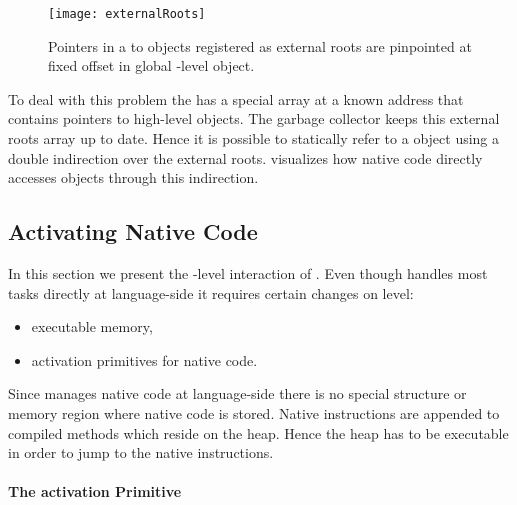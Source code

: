 \begin{figure}[h]
	\centering
	\texttt{[image: externalRoots]}
	\caption[\NBFFI External Roots]{Pointers in a  to objects registered as external roots are pinpointed at fixed offset in global \VM-level object.}
\end{figure}

To deal with this problem the \VM has a special array at a known address that contains pointers to high-level objects.
The garbage collector keeps this external roots array up to date.
Hence it is possible to statically refer to a \PH object using a double indirection over the external roots.
 visualizes how native code directly accesses \PH objects through this indirection.


\subsection{Activating Native Code}

In this section we present the \VM-level interaction of \NB.
Even though \NB handles most tasks directly at language-side it requires certain changes on \VM level:
\begin{itemize}
	\item executable memory,
	\item activation primitives for native code.
\end{itemize}
%
Since \NB manages native code at language-side there is no special structure or memory region where native code is stored.
Native instructions are appended to compiled methods which reside on the heap.
Hence the heap has to be executable in order to jump to the native instructions.


\paragraph{The \NB activation Primitive}

